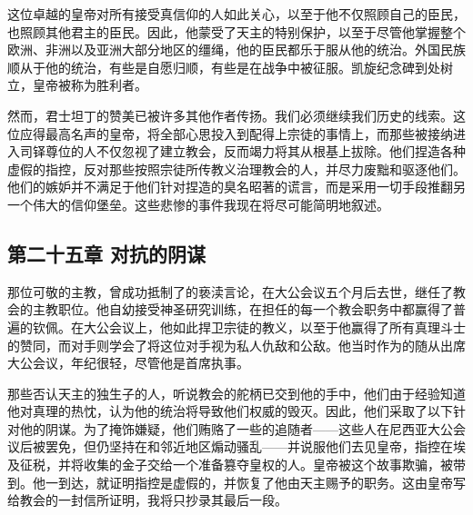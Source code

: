 这位卓越的皇帝对所有接受真信仰的人如此关心，以至于他不仅照顾自己的臣民，也照顾其他君主的臣民。因此，他蒙受了天主的特别保护，以至于尽管他掌握整个欧洲、非洲以及亚洲大部分地区的缰绳，他的臣民都乐于服从他的统治。外国民族顺从于他的统治，有些是自愿归顺，有些是在战争中被征服。凯旋纪念碑到处树立，皇帝被称为胜利者。\par

然而，君士坦丁的赞美已被许多其他作者传扬。我们必须继续我们历史的线索。这位应得最高名声的皇帝，将全部心思投入到配得上宗徒的事情上，而那些被接纳进入司铎尊位的人不仅忽视了建立教会，反而竭力将其从根基上拔除。他们捏造各种虚假的指控，反对那些按照宗徒所传教义治理教会的人，并尽力废黜和驱逐他们。他们的嫉妒并不满足于他们针对捏造的臭名昭著的谎言，而是采用一切手段推翻另一个伟大的信仰堡垒。这些悲惨的事件我现在将尽可能简明地叙述。\par


\subsection{第二十五章 对抗的阴谋}

那位可敬的主教，曾成功抵制了的亵渎言论，在大公会议五个月后去世，继任了教会的主教职位。他自幼接受神圣研究训练，在担任的每一个教会职务中都赢得了普遍的钦佩。在大公会议上，他如此捍卫宗徒的教义，以至于他赢得了所有真理斗士的赞同，而对手则学会了将这位对手视为私人仇敌和公敌。他当时作为的随从出席大公会议，年纪很轻，尽管他是首席执事。\par

那些否认天主的独生子的人，听说教会的舵柄已交到他的手中，他们由于经验知道他对真理的热忱，认为他的统治将导致他们权威的毁灭。因此，他们采取了以下针对他的阴谋。为了掩饰嫌疑，他们贿赂了一些的追随者——这些人在尼西亚大公会议后被罢免，但仍坚持在和邻近地区煽动骚乱——并说服他们去见皇帝，指控在埃及征税，并将收集的金子交给一个准备篡夺皇权的人。皇帝被这个故事欺骗，被带到。他一到达，就证明指控是虚假的，并恢复了他由天主赐予的职务。这由皇帝写给教会的一封信所证明，我将只抄录其最后一段。\par

\par

